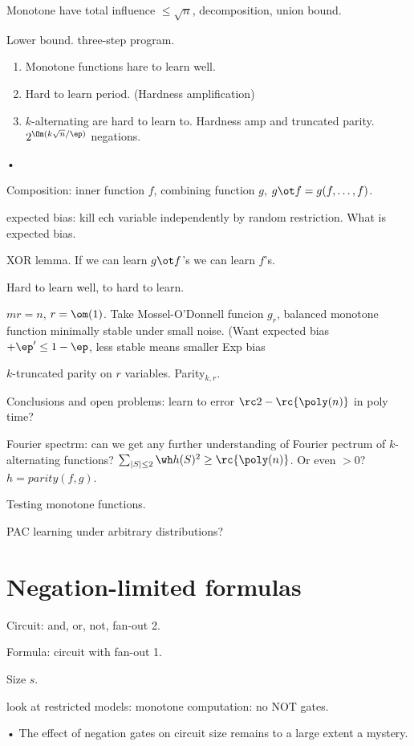 Monotone have total influence $\le \sqrt n$, decomposition, union bound.

Lower bound. three-step program. 
\begin{enumerate}
\item
Monotone functions hare to learn well.
\item 
Hard to learn period. (Hardness amplification)
\item
$k$-alternating are hard to learn to. Hardness amp and truncated parity. $2^{\Om(k\sqrt n/\ep)}$ negations. 
\end{enumerate}•

Composition: inner function $f$, combining function $g$, $g\ot f=g(f,\ldots, f)$. 

expected bias: kill ech variable independently by random restriction. What is expected bias. 

XOR lemma. If we can learn $g\ot f$'s we can learn $f$'s.

Hard to learn well, to hard to learn.

$mr=n$, $r=\om(1)$.
Take Mossel-O'Donnell funcion $g_r$, balanced monotone function minimally stable under small noise. (Want expected bias $+\ep'\le 1-\ep$, less stable means smaller Exp bias

$k$-truncated parity on $r$ variables. Parity${}_{k,r}$.

Conclusions and open problems: learn to error $\rc2-\rc{\poly(n)}$ in poly time? 

Fourier spectrm: can we get any further understanding of Fourier pectrum of $k$-alternating functions? $\sum_{|S|\le 2}\wh h(S)^2 \ge \rc{\poly(n)}$. Or even $>0$?
$h=parity(f,g)$.

Testing monotone functions.

PAC learning under arbitrary distributions?

\section{Negation-limited formulas}

Circuit: and, or, not, fan-out 2.

Formula: circuit with fan-out 1.

Size $s$.

look at restricted models: monotone computation: no NOT gates.

\begin{enumerate}
\item
Circuit loewr bound, monotone vs. general $2^{\Om(n/\ln n)^{\rc 3}$ vs $5n$.
\item
Formula $2^{\Om(n/\ln n)}$, $n^{3-o(1)}$.
\end{enumerate}•
The effect of negation gates on circuit size remains to a large extent a mystery.

